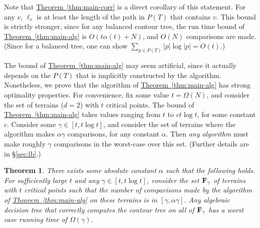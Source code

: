 \documentclass[11pt]{article}
\newcommand{\myparagraph}[1]{\paragraph{#1}}
\newtheorem{theorem}{Theorem}[section]
\theoremstyle{definition}
\newcommand{\bF}{{\bf F}}
\newcommand{\Sec}[1]{\hyperref[sec:#1]{\S\ref*{sec:#1}}} %
\newcommand{\Thm}[1]{\hyperref[thm:#1]{Theorem~\ref*{thm:#1}}} %
\newcommand{\etal}{\textit{et~al.}\xspace}
\newcommand{\thmConst}{\gamma}
\begin{document}
Note that \Thm{main-corr} is a direct corollary of this statement. For any $v$, $\ell_v$ is at least
the length of the path in $P(T)$ that contains $v$.
This bound is strictly stronger,
since for any balanced contour tree, the run time bound of \Thm{main-alg} is $O(t\alpha(t) + N)$, and $O(N)$
comparisons are made. (Since for a balanced tree, one can show $\sum_{p \in P(T)} |p|\log |p|= O(t)$.)

The bound of \Thm{main-alg} may seem artificial, since it actually depends on the $P(T)$ that
is implicitly constructed by the algorithm. Nonetheless, we prove that the algorithm of \Thm{main-alg}
has strong optimality properties. For convenience, fix some value $t=\Omega(N)$, and consider the set
of terrains ($d=2$) with $t$ critical points. The bound of \Thm{main-alg} takes values ranging
from $t$ to $c t\log t$, for some constant $c$. Consider some $\thmConst \in [t,t\log t]$, and consider the set of terrains
where the algorithm makes $\alpha \thmConst$ comparisons, for any constant $\alpha$. Then \emph{any algorithm} must make roughly $\thmConst$
comparisons in the worst-case over this set. (Further details are in \Sec{lb}.)

\begin{theorem} 
\label{thm:main-lb}
There exists some absolute constant $\alpha$ such that the following holds.
For sufficiently large $t$ and any $\thmConst\in [t, t\log t]$, consider the set $\bF_\thmConst$ of terrains with $t$ critical points such that
the number of comparisons made by the algorithm of \Thm{main-alg} on these terrains is in $[\thmConst,\alpha \thmConst]$.
Any algebraic decision tree that correctly computes
the contour tree on all of $\bF_\thmConst$ has a worst case running time of $\Omega(\thmConst)$.
\end{theorem}
% 
% 
\end{document}
